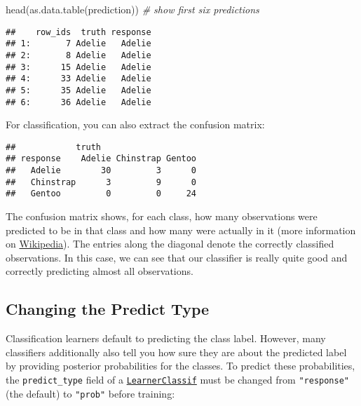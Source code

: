 \documentclass[
]{scrbook}
\newenvironment{Shaded}{\begin{snugshade}}{\end{snugshade}}
\newcommand{\CommentTok}[1]{\textcolor[rgb]{0.56,0.35,0.01}{\textit{#1}}}
\newcommand{\FunctionTok}[1]{\textcolor[rgb]{0.00,0.00,0.00}{#1}}
\newcommand{\NormalTok}[1]{#1}
\newcommand{\SpecialCharTok}[1]{\textcolor[rgb]{0.00,0.00,0.00}{#1}}
\renewenvironment{Shaded} {\begin{snugshade}\small} {\end{snugshade}}
\begin{document}
\begin{Shaded}
\begin{Highlighting}[]
\FunctionTok{head}\NormalTok{(}\FunctionTok{as.data.table}\NormalTok{(prediction)) }\CommentTok{\# show first six predictions}
\end{Highlighting}
\end{Shaded}

\begin{verbatim}
##    row_ids  truth response
## 1:       7 Adelie   Adelie
## 2:       8 Adelie   Adelie
## 3:      15 Adelie   Adelie
## 4:      33 Adelie   Adelie
## 5:      35 Adelie   Adelie
## 6:      36 Adelie   Adelie
\end{verbatim}

For classification, you can also extract the confusion matrix:

\begin{Shaded}
\end{Shaded}

\begin{verbatim}
##            truth
## response    Adelie Chinstrap Gentoo
##   Adelie        30         3      0
##   Chinstrap      3         9      0
##   Gentoo         0         0     24
\end{verbatim}

The confusion matrix shows, for each class, how many observations were predicted to be in that class and how many were actually in it (more information on \href{https://en.wikipedia.org/wiki/Confusion_matrix}{Wikipedia}).
The entries along the diagonal denote the correctly classified observations.
In this case, we can see that our classifier is really quite good and correctly predicting almost all observations.

\hypertarget{predict-type}{%
\subsection{Changing the Predict Type}\label{predict-type}}

Classification learners default to predicting the class label.
However, many classifiers additionally also tell you how sure they are about the predicted label by providing posterior probabilities for the classes.
To predict these probabilities, the \texttt{predict\_type} field of a \href{https://mlr3.mlr-org.com/reference/LearnerClassif.html}{\texttt{LearnerClassif}} must be changed from \texttt{"response"} (the default) to \texttt{"prob"} before training:
\end{document}
